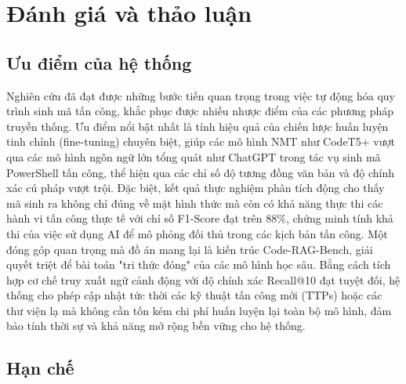 \chapter{Đánh giá và thảo luận} %
\label{Chapter5}


\section{Ưu điểm của hệ thống}

Nghiên cứu đã đạt được những bước tiến quan trọng trong việc tự động hóa quy trình sinh mã tấn công, khắc phục được nhiều nhược điểm của các phương pháp truyền thống. Ưu điểm nổi bật nhất là tính hiệu quả của chiến lược huấn luyện tinh chỉnh (fine-tuning) chuyên biệt, giúp các mô hình NMT như CodeT5+ vượt qua các mô hình ngôn ngữ lớn tổng quát như ChatGPT trong tác vụ sinh mã PowerShell tấn công, thể hiện qua các chỉ số độ tương đồng văn bản và độ chính xác cú pháp vượt trội. Đặc biệt, kết quả thực nghiệm phân tích động cho thấy mã sinh ra không chỉ đúng về mặt hình thức mà còn có khả năng thực thi các hành vi tấn công thực tế với chỉ số F1-Score đạt trên 88\%, chứng minh tính khả thi của việc sử dụng AI để mô phỏng đối thủ trong các kịch bản tấn công. Một đóng góp quan trọng mà đồ án mang lại là kiến trúc Code-RAG-Bench, giải quyết triệt để bài toán "tri thức đóng" của các mô hình học sâu. Bằng cách tích hợp cơ chế truy xuất ngữ cảnh động với độ chính xác Recall@10 đạt tuyệt đối, hệ thống cho phép cập nhật tức thời các kỹ thuật tấn công mới (TTPs) hoặc các thư viện lạ mà không cần tốn kém chi phí huấn luyện lại toàn bộ mô hình, đảm bảo tính thời sự và khả năng mở rộng bền vững cho hệ thống.

\section{Hạn chế}

